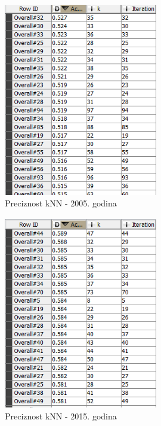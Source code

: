 \documentclass[a4paper]{article}
\begin{document}
\begin{figure}[H]
	\begin{center}
		\includegraphics[width=0.6\textwidth]{Klasifikacija/kNN/Preciznost2005.png}
	\end{center}
	\caption{Preciznost kNN - 2005. godina}
	\label{fig:PreciznostKNN2005}
\end{figure}
\begin{figure}[H]
	\begin{center}
		\includegraphics[width=0.6\textwidth]{Klasifikacija/kNN/Preciznost2015.png}
	\end{center}
	\caption{Preciznost kNN - 2015. godina}
	\label{fig:PreciznostKNN2015}
\end{figure}
\end{document}
